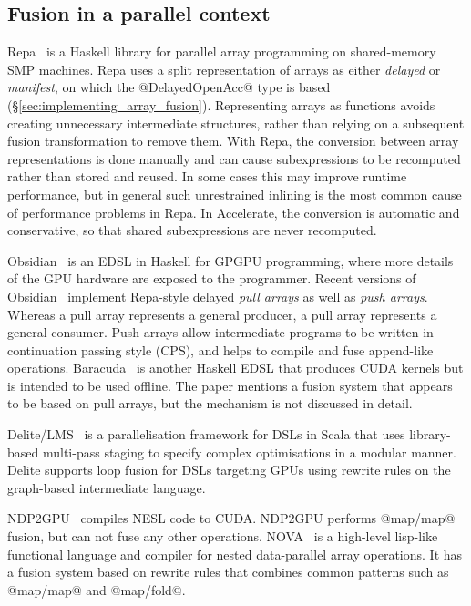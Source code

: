 \subsection{Fusion in a parallel context}

Repa~\cite{Keller:2010er} is a Haskell library for parallel array programming on
shared-memory SMP machines. Repa uses a split
representation of arrays as either \emph{delayed} or \emph{manifest}, on which
the @DelayedOpenAcc@ type is based (\S\ref{sec:implementing_array_fusion}).
Representing arrays as functions avoids creating unnecessary intermediate
structures, rather than relying on a subsequent fusion transformation to remove
them. With Repa, the conversion between array representations is done manually
and can cause subexpressions to be recomputed rather than stored and reused. In
some cases this may improve runtime performance, but in general such
unrestrained inlining is the most common cause of performance problems in Repa.
In Accelerate, the conversion is automatic and conservative, so that shared
subexpressions are never recomputed.

Obsidian~\cite{Svensson:2008a} is an EDSL in Haskell for GPGPU programming,
where more details of the GPU hardware are exposed to the programmer. Recent
versions of Obsidian~\cite{Claessen:2012hl} implement Repa-style delayed
\emph{pull arrays} as well as \emph{push
arrays}. Whereas a pull array represents a general
producer, a pull array represents a general consumer. Push arrays allow
intermediate programs to be written in continuation passing style
(CPS), and helps to compile and fuse append-like operations.
Baracuda~\cite{Larsen:2011fa} is another Haskell EDSL that produces CUDA kernels
but is intended to be used offline. The paper mentions a fusion system that
appears to be based on pull arrays, but the mechanism is not discussed in
detail.

Delite/LMS~\cite{Rompf:2013er} is a parallelisation framework for DSLs in Scala
that uses library-based multi-pass staging to specify complex optimisations in a
modular manner. Delite supports loop fusion for DSLs targeting GPUs using
rewrite rules on the graph-based intermediate language.

NDP2GPU~\cite{Bergstrom:2012bi} compiles NESL code to CUDA. NDP2GPU performs
@map/map@ fusion, but can not fuse any other operations.
NOVA~\cite{Collins:2013wn} is a high-level lisp-like functional language and
compiler for nested data-parallel array operations. It has a fusion system based
on rewrite rules that combines common patterns such as @map/map@ and @map/fold@.

